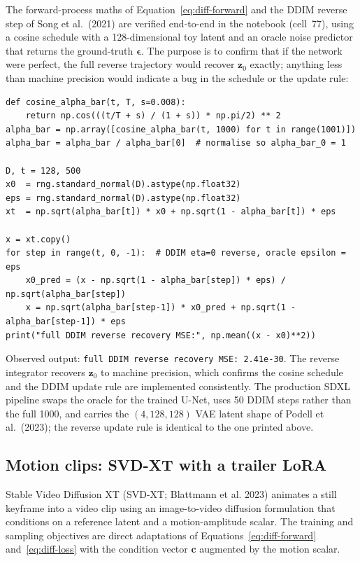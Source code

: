 \documentclass{article}
\begin{document}
The forward-process maths of Equation~\ref{eq:diff-forward} and the DDIM reverse step of Song et al.~(2021) are verified end-to-end in the notebook (cell~77), using a cosine schedule with a 128-dimensional toy latent and an oracle noise predictor that returns the ground-truth $\boldsymbol{\epsilon}$. The purpose is to confirm that if the network were perfect, the full reverse trajectory would recover $\mathbf{z}_0$ exactly; anything less than machine precision would indicate a bug in the schedule or the update rule:

\begin{lstlisting}[caption={Cosine schedule + DDIM reverse with an oracle denoiser. Library-backed equivalent: \texttt{diffusers.DDIMScheduler}.}]
def cosine_alpha_bar(t, T, s=0.008):
    return np.cos(((t/T + s) / (1 + s)) * np.pi/2) ** 2
alpha_bar = np.array([cosine_alpha_bar(t, 1000) for t in range(1001)])
alpha_bar = alpha_bar / alpha_bar[0]  # normalise so alpha_bar_0 = 1

D, t = 128, 500
x0  = rng.standard_normal(D).astype(np.float32)
eps = rng.standard_normal(D).astype(np.float32)
xt  = np.sqrt(alpha_bar[t]) * x0 + np.sqrt(1 - alpha_bar[t]) * eps

x = xt.copy()
for step in range(t, 0, -1):  # DDIM eta=0 reverse, oracle epsilon = eps
    x0_pred = (x - np.sqrt(1 - alpha_bar[step]) * eps) / np.sqrt(alpha_bar[step])
    x = np.sqrt(alpha_bar[step-1]) * x0_pred + np.sqrt(1 - alpha_bar[step-1]) * eps
print("full DDIM reverse recovery MSE:", np.mean((x - x0)**2))
\end{lstlisting}

\noindent Observed output: \texttt{full DDIM reverse recovery MSE: 2.41e-30}. The reverse integrator recovers $\mathbf{z}_0$ to machine precision, which confirms the cosine schedule and the DDIM update rule are implemented consistently. The production SDXL pipeline swaps the oracle for the trained U-Net, uses 50 DDIM steps rather than the full 1000, and carries the $(4, 128, 128)$ VAE latent shape of Podell et al.~(2023); the reverse update rule is identical to the one printed above.

\subsection{Motion clips: SVD-XT with a trailer LoRA}

Stable Video Diffusion XT (SVD-XT; Blattmann et al. 2023) animates a still keyframe into a video clip using an image-to-video diffusion formulation that conditions on a reference latent and a motion-amplitude scalar. The training and sampling objectives are direct adaptations of Equations~\ref{eq:diff-forward} and~\ref{eq:diff-loss} with the condition vector $\mathbf{c}$ augmented by the motion scalar.
\end{document}

